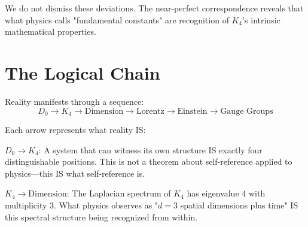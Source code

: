 \documentclass[11pt,a4paper]{book}
\begin{document}
We do not dismiss these deviations. The near-perfect correspondence reveals that what physics calls "fundamental constants" are recognition of $K_4$'s intrinsic mathematical properties.

\section{The Logical Chain}

Reality manifests through a sequence:
\[
D_0 \to K_4 \to \text{Dimension} \to \text{Lorentz} \to \text{Einstein} \to \text{Gauge Groups}
\]

\begin{center}
\end{center}

Each arrow represents what reality IS:

\textbf{$D_0 \to K_4$}: A system that can witness its own structure IS exactly four distinguishable positions. This is not a theorem about self-reference applied to physics—this IS what self-reference is.

\textbf{$K_4 \to \text{Dimension}$}: The Laplacian spectrum of $K_4$ has eigenvalue $4$ with multiplicity $3$. What physics observes as "$d=3$ spatial dimensions plus time" IS this spectral structure being recognized from within.
\end{document}
